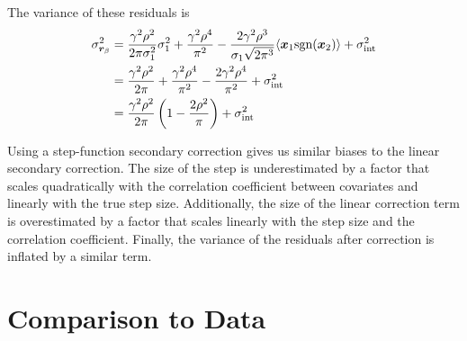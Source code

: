 The variance of these residuals is
\begin{align*}
    \sigma_{\bm{r}_\beta}^2 &= \frac{\gamma^2\rho^2}{2\pi\sigma_1^2}\sigma_1^2 + \frac{\gamma^2\rho^4}{\pi^2} - \frac{2\gamma^2\rho^3}{\sigma_1\sqrt{2\pi^3}}\langle\bm{x}_1\text{sgn}(\bm{x}_2)\rangle + \sigma_{\text{int}}^2\\
    &= \frac{\gamma^2\rho^2}{2\pi} + \frac{\gamma^2\rho^4}{\pi^2} - \frac{2\gamma^2\rho^4}{\pi^2} + \sigma_{\text{int}}^2\\
    &= \frac{\gamma^2\rho^2}{2\pi}\left(1-\frac{2\rho^2}{\pi}\right) + \sigma_{\text{int}}^2
\end{align*}

Using a step-function secondary correction gives us similar biases to the linear secondary correction. The size of the step is underestimated by a factor that scales quadratically with the correlation coefficient between covariates and linearly with the true step size. Additionally, the size of the linear correction term is overestimated by a factor that scales linearly with the step size and the correlation coefficient. Finally, the variance of the residuals after correction is inflated by a similar term.

\section{Comparison to Data}
\label{sec:data_comparison}

